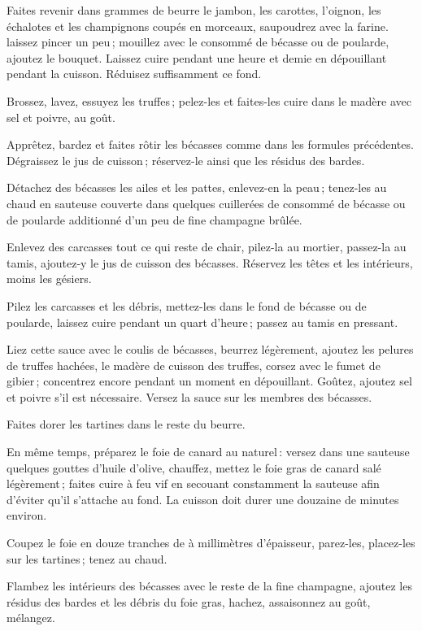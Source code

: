 Faites revenir dans {\mmm} grammes de beurre le jambon, les carottes,
l'oignon, les échalotes et les champignons coupés en morceaux, saupoudrez avec
la farine. laissez pincer un peu ; mouillez avec le consommé de bécasse ou de
poularde, ajoutez le bouquet. Laissez cuire pendant une heure et demie en
dépouillant pendant la cuisson. Réduisez suffisamment ce fond.

Brossez, lavez, essuyez les truffes ; pelez-les et faites-les cuire dans le
madère avec sel et poivre, au goût.

Apprêtez, bardez et faites rôtir les bécasses comme dans les formules
précédentes. Dégraissez le jus de cuisson ; réservez-le ainsi que les résidus
des bardes.

Détachez des bécasses les ailes et les pattes, enlevez-en la peau ; tenez-les
au chaud en sauteuse couverte dans quelques cuillerées de consommé de bécasse
ou de poularde additionné d'un peu de fine champagne brûlée.

Enlevez des carcasses tout ce qui reste de chair, pilez-la au mortier,
passez-la au tamis, ajoutez-y le jus de cuisson des bécasses. Réservez les
têtes et les intérieurs, moins les gésiers.

Pilez les carcasses et les débris, mettez-les dans le fond de bécasse ou de
poularde, laissez cuire pendant un quart d'heure ; passez au tamis en pressant.

Liez cette sauce avec le coulis de bécasses, beurrez légèrement, ajoutez les
pelures de truffes hachées, le madère de cuisson des truffes, corsez avec le
fumet de gibier ; concentrez encore pendant un moment en dépouillant. Goûtez,
ajoutez sel et poivre s'il est nécessaire. Versez la sauce sur les membres des
bécasses.

Faites dorer les tartines dans le reste du beurre.

En même temps, préparez le foie de canard au naturel : versez dans une sauteuse
quelques gouttes d'huile d'olive, chauffez, mettez le foie gras de canard salé
légèrement ; faites cuire à feu vif en secouant constamment la sauteuse afin
d'éviter qu'il s'attache au fond. La cuisson doit durer une douzaine de minutes
environ.

Coupez le foie en douze tranches de {\mmm} à {\mmm} millimètres
d'épaisseur, parez-les, placez-les sur les tartines ; tenez au chaud.

Flambez les intérieurs des bécasses avec le reste de la fine champagne, ajoutez
les résidus des bardes et les débris du foie gras, hachez, assaisonnez au goût,
mélangez.

